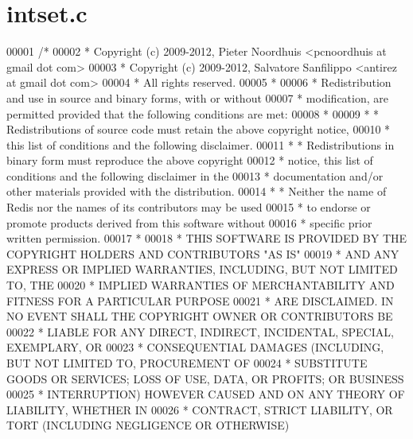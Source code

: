 \hypertarget{intset_8c_source}{}\section{intset.\+c}
\label{intset_8c_source}

\begin{DoxyCode}
00001 \textcolor{comment}{/*}
00002 \textcolor{comment}{ * Copyright (c) 2009-2012, Pieter Noordhuis <pcnoordhuis at gmail dot com>}
00003 \textcolor{comment}{ * Copyright (c) 2009-2012, Salvatore Sanfilippo <antirez at gmail dot com>}
00004 \textcolor{comment}{ * All rights reserved.}
00005 \textcolor{comment}{ *}
00006 \textcolor{comment}{ * Redistribution and use in source and binary forms, with or without}
00007 \textcolor{comment}{ * modification, are permitted provided that the following conditions are met:}
00008 \textcolor{comment}{ *}
00009 \textcolor{comment}{ *   * Redistributions of source code must retain the above copyright notice,}
00010 \textcolor{comment}{ *     this list of conditions and the following disclaimer.}
00011 \textcolor{comment}{ *   * Redistributions in binary form must reproduce the above copyright}
00012 \textcolor{comment}{ *     notice, this list of conditions and the following disclaimer in the}
00013 \textcolor{comment}{ *     documentation and/or other materials provided with the distribution.}
00014 \textcolor{comment}{ *   * Neither the name of Redis nor the names of its contributors may be used}
00015 \textcolor{comment}{ *     to endorse or promote products derived from this software without}
00016 \textcolor{comment}{ *     specific prior written permission.}
00017 \textcolor{comment}{ *}
00018 \textcolor{comment}{ * THIS SOFTWARE IS PROVIDED BY THE COPYRIGHT HOLDERS AND CONTRIBUTORS "AS IS"}
00019 \textcolor{comment}{ * AND ANY EXPRESS OR IMPLIED WARRANTIES, INCLUDING, BUT NOT LIMITED TO, THE}
00020 \textcolor{comment}{ * IMPLIED WARRANTIES OF MERCHANTABILITY AND FITNESS FOR A PARTICULAR PURPOSE}
00021 \textcolor{comment}{ * ARE DISCLAIMED. IN NO EVENT SHALL THE COPYRIGHT OWNER OR CONTRIBUTORS BE}
00022 \textcolor{comment}{ * LIABLE FOR ANY DIRECT, INDIRECT, INCIDENTAL, SPECIAL, EXEMPLARY, OR}
00023 \textcolor{comment}{ * CONSEQUENTIAL DAMAGES (INCLUDING, BUT NOT LIMITED TO, PROCUREMENT OF}
00024 \textcolor{comment}{ * SUBSTITUTE GOODS OR SERVICES; LOSS OF USE, DATA, OR PROFITS; OR BUSINESS}
00025 \textcolor{comment}{ * INTERRUPTION) HOWEVER CAUSED AND ON ANY THEORY OF LIABILITY, WHETHER IN}
00026 \textcolor{comment}{ * CONTRACT, STRICT LIABILITY, OR TORT (INCLUDING NEGLIGENCE OR OTHERWISE)}

\end{DoxyCode}
